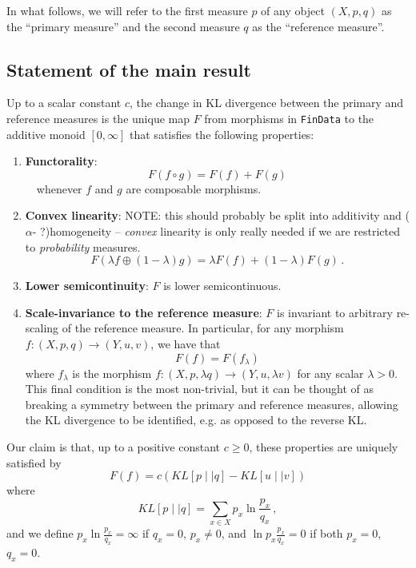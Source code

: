 \documentclass{article}
\begin{document}
{In what follows, we will refer to the first measure $p$ of any object $(X, p, q)$ as the ``primary measure'' and the second measure $q$ as the ``reference measure''.

\subsection{Statement of the main result}
Up to a scalar constant $c$, the change in KL divergence between the primary and reference measures is the unique map $F$ from morphisms in \texttt{FinData} to the additive monoid $[0, \infty]$ that satisfies the following properties:
\begin{enumerate}
    \item \textbf{Functorality}:
      $$
      F(f \circ g) = F(f) + F(g)
      $$
      $\quad$whenever $f$ and $g$ are composable morphisms.
      
    \item \textbf{Convex linearity}: NOTE: this should probably be split into additivity and ($\alpha$- ?)homogeneity  -- \textit{convex} linearity is only really needed if we are restricted to \textit{probability} measures.
      $$
        F(\lambda f \oplus (1-\lambda)g) = \lambda F(f) + (1 - \lambda)F(g)\,.
      $$
    \item \textbf{Lower semicontinuity}: $F$ is lower semicontinuous.
    \item \textbf{Scale-invariance to the reference measure}: $F$ is invariant to arbitrary re-scaling of the reference measure. In particular, for any morphism $f:(X, p, q) \rightarrow (Y, u, v)$, we have that 
      $$
        F(f) = F(f_\lambda)
      $$
    where $f_\lambda$ is the morphism $f:(X, p, \lambda q) \rightarrow (Y, u, \lambda v)$ for any scalar $\lambda > 0$. This final condition is the most non-trivial, but it can be thought of as breaking a symmetry between the primary and reference measures, allowing the KL divergence to be identified, e.g. as opposed to the reverse KL.
\end{enumerate}

Our claim is that, up to a positive constant $c \geq 0$, these properties are uniquely satisfied by 
\begin{equation} \label{claim}
    F(f) = c(KL[p \mid\mid q] - KL[u \mid\mid v])
\end{equation}
where
$$
 KL[p \mid\mid q] = \sum_{x\in X} p_x \ln \frac{p_x}{q_x}\,,
$$
and we define $p_x\ln \frac{p_x}{q_x} = \infty$ if $q_x = 0$, $p_x\neq 0$, and $\ln p_x\frac{p_x}{q_x} = 0$ if both $p_x = 0$, $q_x = 0$.

}
\end{document}
